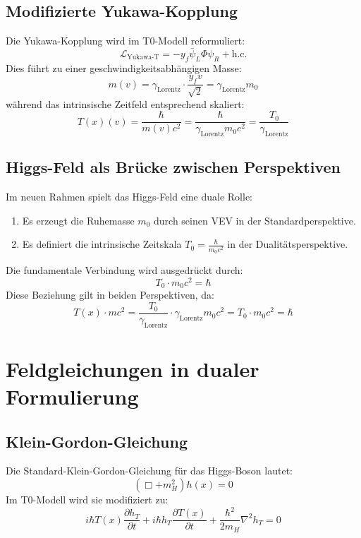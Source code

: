\documentclass[a4paper,12pt]{article}
\newcommand{\Tfield}{T(x)}
\newcommand{\Tzero}{T_0}
\newcommand{\gammaf}{\gamma_{\text{Lorentz}}}
\begin{document}
	\subsection{Modifizierte Yukawa-Kopplung}
	Die Yukawa-Kopplung wird im T0-Modell reformuliert:
	\begin{equation}
		\mathcal{L}_{\text{Yukawa-T}} = -y_f \bar{\psi}_L \Phi \psi_R + \text{h.c.}
	\end{equation}
	Dies führt zu einer geschwindigkeitsabhängigen Masse:
	\begin{equation}
		m(v) = \gammaf \cdot \frac{y_f v}{\sqrt{2}} = \gammaf m_0
	\end{equation}
	während das intrinsische Zeitfeld entsprechend skaliert:
	\begin{equation}
		\Tfield(v) = \frac{\hbar}{m(v)c^2} = \frac{\hbar}{\gammaf m_0 c^2} = \frac{\Tzero}{\gammaf}
	\end{equation}
	
	\subsection{Higgs-Feld als Brücke zwischen Perspektiven}
	Im neuen Rahmen spielt das Higgs-Feld eine duale Rolle:
	\begin{enumerate}
		\item Es erzeugt die Ruhemasse \( m_0 \) durch seinen VEV in der Standardperspektive.
		\item Es definiert die intrinsische Zeitskala \( \Tzero = \frac{\hbar}{m_0 c^2} \) in der Dualitätsperspektive.
	\end{enumerate}
	Die fundamentale Verbindung wird ausgedrückt durch:
	\begin{equation}
		\Tzero \cdot m_0 c^2 = \hbar
	\end{equation}
	Diese Beziehung gilt in beiden Perspektiven, da:
	\begin{equation}
		\Tfield \cdot m c^2 = \frac{\Tzero}{\gammaf} \cdot \gammaf m_0 c^2 = \Tzero \cdot m_0 c^2 = \hbar
	\end{equation}
	
	\section{Feldgleichungen in dualer Formulierung}
	\subsection{Klein-Gordon-Gleichung}
	Die Standard-Klein-Gordon-Gleichung für das Higgs-Boson lautet:
	\begin{equation}
		(\Box + m_H^2) h(x) = 0
	\end{equation}
	Im T0-Modell wird sie modifiziert zu:
	\begin{equation}
		i\hbar \Tfield \frac{\partial h_T}{\partial t} + i\hbar h_T \frac{\partial \Tfield}{\partial t} + \frac{\hbar^2}{2 m_H} \nabla^2 h_T = 0
	\end{equation}
	
\end{document}

